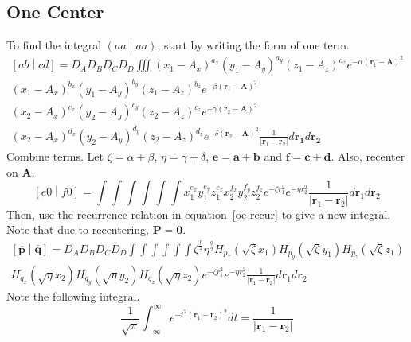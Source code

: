  \subsection{One Center}
To find the integral $\left(aa\middle|aa\right)$, start by writing the form of one term.
\begin{multline}
  \left[ab\middle|cd\right] = D_A D_B D_C D_D \iiint\left(x_1 - A_x\right)^{a_x}\left(y_1 - A_y\right)^{a_y} \left(z_1 - A_z\right)^{a_z} e^{-\alpha\left(\mathbf{r}_1 - \mathbf{A}\right)^2} \\
  \left(x_1 - A_x\right)^{b_x}\left(y_1 - A_y\right)^{b_y} \left(z_1 - A_z\right)^{b_z}  e^{-\beta\left(\mathbf{r}_1 - \mathbf{A}\right)^2} \\
  \left(x_2 - A_x\right)^{c_x}\left(y_2 - A_y\right)^{c_y} \left(z_2 - A_z\right)^{c_z} e^{-\gamma\left(\mathbf{r}_2 - \mathbf{A}\right)^2} \\
  \left(x_2 - A_x\right)^{d_x}\left(y_2 - A_y\right)^{d_y} \left(z_2 - A_z\right)^{d_z}  e^{-\delta\left(\mathbf{r}_2 - \mathbf{A}\right)^2} \frac{1}{\left|\mathbf{r}_1 - \mathbf{r}_2\right|} d\mathbf{r_1} d\mathbf{r_2}
  \label{oc-integral}
\end{multline}
Combine terms. Let $\zeta = \alpha + \beta$, $\eta = \gamma + \delta$, $\mathbf{e} = \mathbf{a} + \mathbf{b}$ and $\mathbf{f} = \mathbf{c} + \mathbf{d}$. Also, recenter on $\mathbf{A}$.
\begin{equation}
  \left[e0\middle|f0\right] = \int\int\int\int\int\int x_1^{e_x}y_1^{e_y} z_1^{e_z} x_2^{f_x} y_2^{f_y}z_2^{f_z} e^{-\zeta r_1^2}e^{-\eta r_2^2}\frac{1}{\left|\mathbf{r}_1 - \mathbf{r}_2\right|} d\mathbf{r}_1 d\mathbf{r}_2
\end{equation}
Then, use the recurrence relation in equation~\ref{oc-recur} to give a new integral. Note that due to recentering, $\mathbf{P} = \mathbf{0}$.
\begin{multline}
  \left[\overline{\mathbf{p}}\middle|\overline{\mathbf{q}}\right] = D_A D_B D_C D_D\int\int\int\int\int\int \zeta^{\frac{p}{2}} \eta^{\frac{q}{2}} H_{p_x}\left(\sqrt{\zeta} x_1\right) H_{p_y}\left(\sqrt{\zeta} y_1\right) H_{p_z}\left(\sqrt{\zeta} z_1\right) \\
  H_{q_x}\left(\sqrt{\eta}x_2\right)H_{q_y}\left(\sqrt{\eta}y_2\right)H_{q_z}\left(\sqrt{\eta}z_2\right) e^{-\zeta r_1^2}e^{-\eta r_2^2} \frac{1}{\left|\mathbf{r}_1 - \mathbf{r}_2\right|} d\mathbf{r}_1 d\mathbf{r}_2
  \label{oc-hermite-integral}
\end{multline}
Note the following integral.
\begin{equation}
  \frac{1}{\sqrt{\pi}} \int_{-\infty}^\infty e^{-t^2\left(\mathbf{r}_1 - \mathbf{r}_2\right)^2} dt = \frac{1}{\left|\mathbf{r}_1 - \mathbf{r}_2\right|}
  \label{jesus-kernel}
\end{equation}
